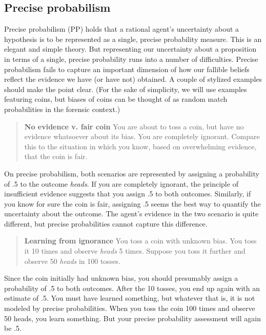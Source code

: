 \documentclass[
  10pt,
  dvipsnames,enabledeprecatedfontcommands]{scrartcl}
\begin{document}
\hypertarget{precise-probabilism}{%
\subsection{Precise probabilism}\label{precise-probabilism}}

Precise probabilism (\textsf{PP}) holds that a rational agent's
uncertainty about a hypothesis is to be represented as a single, precise
probability measure. This is an elegant and simple theory. But
representing our uncertainty about a proposition in terms of a single,
precise probability runs into a number of difficulties. Precise
probabilism fails to capture an important dimension of how our fallible
beliefs reflect the evidence we have (or have not) obtained. A couple of
stylized examples should make the point clear. (For the sake of
simplicity, we will use examples featuring coins, but biases of coins
can be thought of as random match probabilities in the forensic
context.)

\begin{quote}
\textbf{No evidence v. fair coin}
You are about to toss a coin, but have no evidence 
whatsoever about its bias. You are completely ignorant. 
Compare this to the situation in which you know, 
based on overwhelming evidence, that the coin is fair. 
\end{quote}

\noindent On precise probabilism, both scenarios are represented by
assigning a probability of .5 to the outcome \emph{heads}. If you are
completely ignorant, the principle of insufficient evidence suggests
that you assign .5 to both outcomes. Similarly, if you know for sure the
coin is fair, assigning .5 seems the best way to quantify the
uncertainty about the outcome. The agent's evidence in the two scenario
is quite different, but precise probabilities cannot capture this
difference.

\begin{quote}
\textbf{Learning from ignorance}
You toss a coin with unknown bias. You toss it 10 times and observe \emph{heads} 5 times. Suppose you toss it further and observe 50 \emph{heads} in 100 tosses. 
\end{quote}

\noindent Since the coin initially had unknown bias, you should
presumably assign a probability of .5 to both outcomes. After the 10
tosses, you end up again with an estimate of .5. You must have learned
something, but whatever that is, it is not modeled by precise
probabilities. When you toss the coin 100 times and observe 50 heads,
you learn something. But your precise probability assessment will again
be .5.
\end{document}
